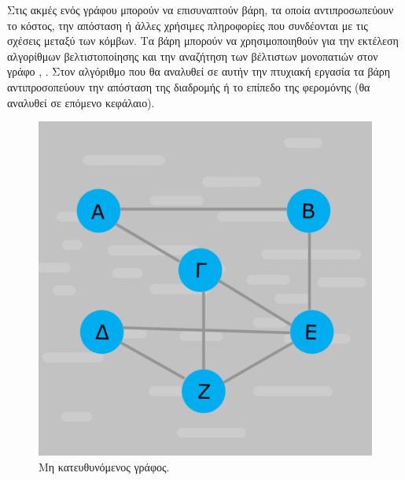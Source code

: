 Στις ακμές ενός γράφου μπορούν να επισυναπτούν βάρη, τα οποία αντιπροσωπεύουν το κόστος, την απόσταση ή άλλες χρήσιμες πληροφορίες που συνδέονται με τις σχέσεις μεταξύ των κόμβων. Τα βάρη μπορούν να χρησιμοποιηθούν για την εκτέλεση αλγορίθμων βελτιστοποίησης και την αναζήτηση των βέλτιστων μονοπατιών στον γράφο \cite{ntenisiwtis2023thewria}, \cite{gkertsis2023thewria}. Στον αλγόριθμο που θα αναλυθεί σε αυτήν την πτυχιακή εργασία τα βάρη αντιπροσοπεύουν την απόσταση της διαδρομής ή το επίπεδο της φερομόνης (θα αναλυθεί σε επόμενο κεφάλαιο). 
\begin{figure}[h]
    \begin{minipage}[c]{.46\linewidth}
        \centering
        \includegraphics[scale=0.15]{2947_thesis/pictures/undirected.png}
        \caption{Μη κατευθυνόμενος γράφος.}
        \label{5}
    \end{minipage}
    \hfill%
    \begin{minipage}[c]{.46\linewidth}
        \centering

\end{minipage}
\end{figure}
